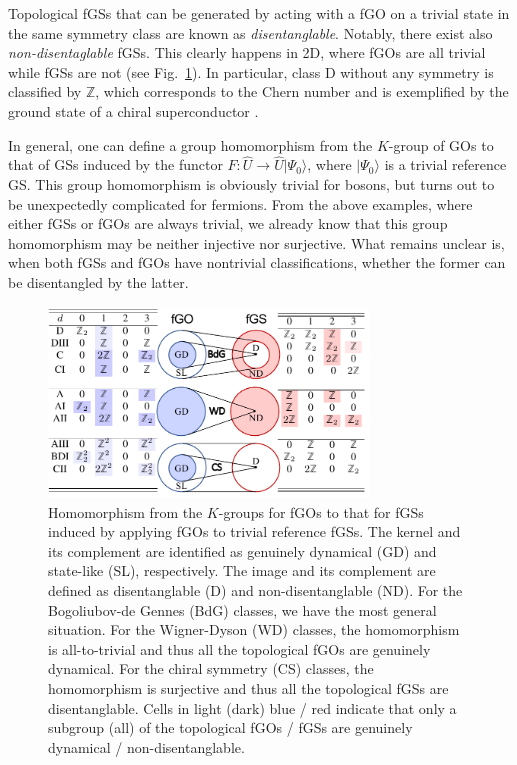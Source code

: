 \documentclass[prl,twocolumn,preprintnumbers,superscriptaddress,amsmath,amssymb]{revtex4-1}
\begin{document}
Topological fGSs that can be generated by acting with a fGO on a trivial state in the same symmetry class are known as \emph{disentanglable}. Notably, there exist also \emph{non-disentaglable} fGSs. This clearly happens in 2D, where fGOs are all trivial while fGSs are not (see Fig.~\ref{fig1}). In particular, class D without any symmetry is classified by $\mathbb{Z}$, which corresponds to the Chern number and is exemplified by the ground state of a chiral superconductor \cite{Sato2009,Qi2010}. 

In general, one can define a group homomorphism from the $K$-group of GOs to that of GSs induced by the functor $F: \hat U\to \hat U|\Psi_0\rangle$, where  $|\Psi_0\rangle$ is a trivial reference GS. This group homomorphism is obviously trivial for bosons, but turns out to be unexpectedly complicated for fermions. From the above examples, where either fGSs or fGOs are always trivial, we already know that this group homomorphism may be neither injective nor surjective. What remains unclear is, when both fGSs and fGOs have nontrivial classifications, whether the former can be disentangled by the latter. 



\begin{figure}
	\begin{center}
		\includegraphics[width=8.5cm, clip]{fig1}
	\end{center}
	\caption{Homomorphism from the $K$-groups for fGOs to that for fGSs induced by applying fGOs to trivial reference fGSs. The kernel and its complement are identified as genuinely dynamical (GD) and state-like (SL), respectively. The image and its complement are defined as disentanglable (D) and non-disentanglable (ND). For the Bogoliubov-de Gennes (BdG) classes, we have the most general situation. For the Wigner-Dyson (WD) classes, the homomorphism is all-to-trivial and thus all the topological fGOs are genuinely dynamical. For the chiral symmetry (CS) classes, the homomorphism is surjective and thus all the topological fGSs are disentanglable. Cells in light (dark) blue / red indicate that only a subgroup (all) of the topological fGOs / fGSs are genuinely dynamical / non-disentanglable.} 
	\label{fig1}
\end{figure}
\end{document}
